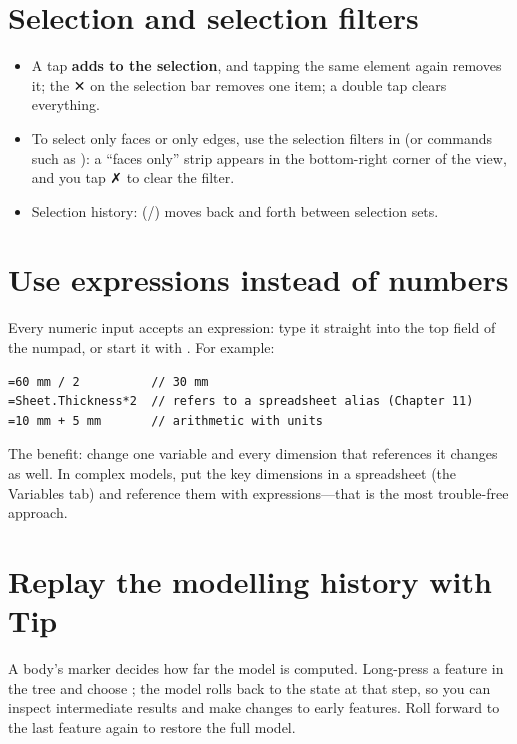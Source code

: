 \section{Selection and selection filters}

\begin{itemize}
  \item A tap \textbf{adds to the selection}, and tapping the same element again removes it; the ✕ on the selection bar removes one item; a double tap clears everything.
  \item To select only faces or only edges, use the selection filters in  (or commands such as ):
        a ``faces only'' strip appears in the bottom-right corner of the view, and you tap ✗ to clear the filter.
  \item Selection history:  (/) moves back and forth between selection sets.
\end{itemize}

\section{Use expressions instead of numbers}

Every numeric input accepts an expression: type it straight into the top field of the numpad, or start it with \file{=}. For example:

\begin{lstlisting}
=60 mm / 2          // 30 mm
=Sheet.Thickness*2  // refers to a spreadsheet alias (Chapter 11)
=10 mm + 5 mm       // arithmetic with units
\end{lstlisting}

The benefit: change one variable and every dimension that references it changes as well. In complex models,
put the key dimensions in a spreadsheet (the Variables tab) and reference them with expressions---that is the
most trouble-free approach.

\section{Replay the modelling history with Tip}

A body's  marker decides how far the model is computed. Long-press a feature in the tree and choose
; the model rolls back to the state at that step, so you can inspect intermediate results
and make changes to early features. Roll forward to the last feature again to restore the full model.

